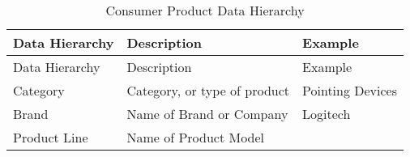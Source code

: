\documentclass[]{article}
\begin{document}
\begin{longtable}[]{@{}lll@{}}
\caption{Consumer Product Data Hierarchy}\tabularnewline
\toprule
\begin{minipage}[b]{0.18\columnwidth}\raggedright\strut
Data Hierarchy\strut
\end{minipage} & \begin{minipage}[b]{0.34\columnwidth}\raggedright\strut
Description\strut
\end{minipage} & \begin{minipage}[b]{0.38\columnwidth}\raggedright\strut
Example\strut
\end{minipage}\tabularnewline
\midrule
\endfirsthead
\toprule
\begin{minipage}[b]{0.18\columnwidth}\raggedright\strut
Data Hierarchy\strut
\end{minipage} & \begin{minipage}[b]{0.34\columnwidth}\raggedright\strut
Description\strut
\end{minipage} & \begin{minipage}[b]{0.38\columnwidth}\raggedright\strut
Example\strut
\end{minipage}\tabularnewline
\midrule
\endhead
\begin{minipage}[t]{0.18\columnwidth}\raggedright\strut
Category\strut
\end{minipage} & \begin{minipage}[t]{0.34\columnwidth}\raggedright\strut
Category, or type of product\strut
\end{minipage} & \begin{minipage}[t]{0.38\columnwidth}\raggedright\strut
Pointing Devices\strut
\end{minipage}\tabularnewline
\begin{minipage}[t]{0.18\columnwidth}\raggedright\strut
Brand\strut
\end{minipage} & \begin{minipage}[t]{0.34\columnwidth}\raggedright\strut
Name of Brand or Company\strut
\end{minipage} & \begin{minipage}[t]{0.38\columnwidth}\raggedright\strut
Logitech\strut
\end{minipage}\tabularnewline
\begin{minipage}[t]{0.18\columnwidth}\raggedright\strut
Product Line\strut
\end{minipage} & \begin{minipage}[t]{0.34\columnwidth}\raggedright\strut
Name of Product Model\strut

\end{minipage}
\end{longtable}
\end{document}
